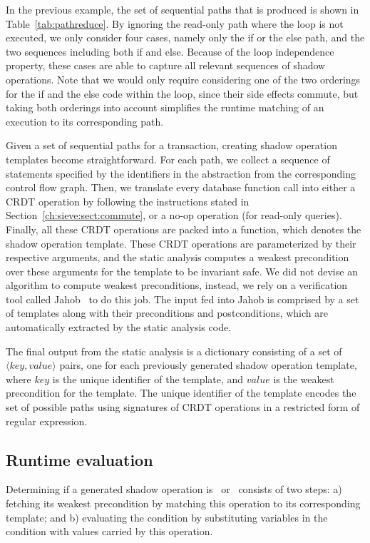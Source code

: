 In the previous example, the set of sequential paths that is produced
is shown in Table~\ref{tab:pathreduce}. By ignoring the read-only path
where the loop is not executed, we only consider four cases, namely only the if or the else path, and the two sequences including both if and else. 
Because of the loop independence property, these
cases are able to capture all relevant sequences of shadow operations.
Note that we would only require considering one of the two
orderings for the if and the else code within the loop,
since their side effects commute, but taking both orderings into
account simplifies the runtime matching of an execution to its
corresponding path.

Given a set of sequential paths for a transaction, creating shadow operation templates become
straightforward. For each path, we collect a sequence of
statements specified by the identifiers in the abstraction from the corresponding control flow graph.
Then, we translate every database function call into either a CRDT operation by following
the instructions stated in Section~\ref{ch:sieve:sect:commute}, or a no-op operation (for read-only queries). 
Finally, all these CRDT operations are packed into a function, which
denotes the shadow operation template. These CRDT operations are parameterized
by their respective arguments, and the
static analysis computes a weakest precondition over
these arguments for the template to be invariant safe. We did not devise an algorithm
to compute weakest preconditions, instead, we rely on a verification tool called Jahob~\cite{Kuncak2007Jahob} to do
this job. The input
fed into Jahob is comprised by a set of templates along with their preconditions and postconditions, which
are automatically extracted by the static analysis code.

The final output from the static analysis is a dictionary consisting of
a set of $\langle key, value\rangle$ pairs, one for each previously generated shadow operation template, where $key$
is the unique identifier of the template,
and $value$ is the weakest precondition for the template.
The unique identifier of the template encodes the set of possible paths 
using signatures of CRDT operations in a restricted form of regular
expression.

\subsection{Runtime evaluation}
\label{ch:sieve:sec:label:runtime}
Determining if a generated shadow operation is \red\ or \blue\ consists
of two steps: a) fetching its weakest precondition by
matching this operation to its corresponding
template; and b) evaluating the condition by substituting
variables in the condition with values carried by this operation.
 
